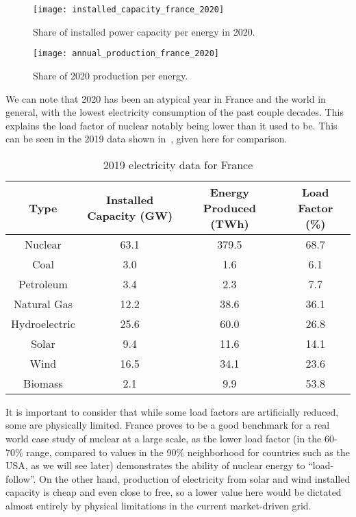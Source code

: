 \begin{figure}[h]
	\texttt{[image: installed\_capacity\_france\_2020]}
	\caption[Share of installed power capacity per energy]{Share of installed power capacity per energy in 2020.}
\end{figure}


\begin{figure}[h]
	\texttt{[image: annual\_production\_france\_2020]}
	\caption[Share of 2020 production per energy]{Share of 2020 production per energy.}
\end{figure}



We can note that 2020 has been an atypical year in France and the world in general, with the lowest electricity consumption of the past couple decades. This explains the load factor of nuclear notably being lower than it used to be. This can be seen in the 2019 data shown in~, given here for comparison.

\begin{table*}[ht]
\caption[2019 electricity data for France]{2019 electricity data for France}
\begin{tabular}{ c c c c }
	\toprule
	Type & Installed Capacity (GW) & Energy Produced (TWh) & Load Factor (\%) \\
	\midrule
	Nuclear & 63.1 & 379.5 & 68.7\\
	Coal & 3.0 & 1.6 & 6.1\\
	Petroleum & 3.4 & 2.3 & 7.7\\
	Natural Gas & 12.2 & 38.6 & 36.1\\
	Hydroelectric & 25.6 & 60.0 & 26.8\\
	Solar & 9.4 & 11.6 & 14.1\\
	Wind & 16.5 & 34.1 & 23.6\\
	Biomass & 2.1 & 9.9 & 53.8\\
	\bottomrule
\end{tabular}
\end{table*}


It is important to consider that while some load factors are artificially reduced, some are physically limited. France proves to be a good benchmark for a real world case study of nuclear at a large scale, as the lower load factor (in the 60-70\% range, compared to values in the 90\% neighborhood for countries such as the USA, as we will see later) demonstrates the ability of nuclear energy to “load-follow”. On the other hand, production of electricity from solar and wind installed capacity is cheap and even close to free, so a lower value here would be dictated almost entirely by physical limitations in the current market-driven grid.


